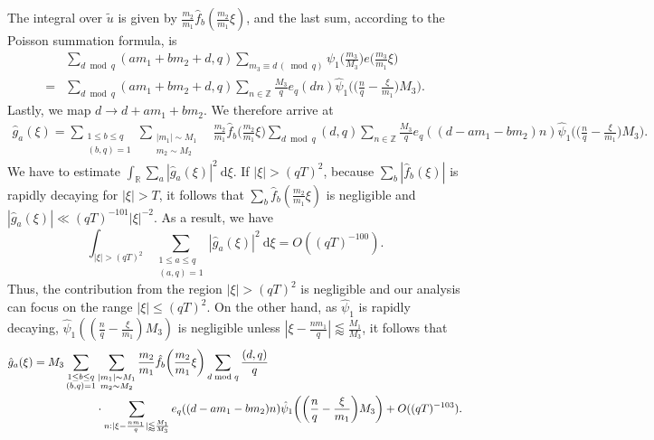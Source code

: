 \documentclass[12pt]{amsart}
\theoremstyle{definition}
\theoremstyle{plain}
\theoremstyle{remark}
\numberwithin{equation}{section}
\numberwithin{theorem}{section}
\numberwithin{equation}{section}
\begin{document}
	The integral over $\tilde{u}$ is given by $\frac{m_{2}}{m_{1}}\hat{f}_{b}(\frac{m_{2}}{m_{1}}\xi)$,  and the last sum, according to the Poisson summation formula, is
	\begin{align*}
		&\sum_{d \bmod q}(am_{1}+bm_{2}+d, q)\sum_{m_{3} \equiv d \, (\!\bmod q)}\psi_{1}\bigg(\frac{m_{3}}{M_{3}}\bigg)e\bigg(\frac{m_{3}}{m_{1}}\xi\bigg)
		\\
		=&\sum_{d \bmod q}(am_{1}+bm_{2}+d, q)\sum_{n \in \mathbb{Z}}\frac{M_{3}}{q}e_q(dn)\hat{\psi}_{1}\bigg(\bigg(\frac{n}{q}-\frac{\xi}{m_{1}}\bigg)M_{3}\bigg).
	\end{align*}
	Lastly, we map $d \to d+am_1+bm_2$. We therefore arrive at
	\begin{align*}
		\hat{g}_{a}(\xi)=\sum_{\substack{1 \leq b \leq q \\ (b, q)=1}}\sum_{\substack{|m_{1}|\sim M_{1} \\ m_{2}\sim M_{2}}}&\frac{m_{2}}{m_{1}}\hat{f}_{b}\bigg(\frac{m_{2}}{m_{1}}\xi\bigg) \sum_{d \bmod q}(d, q)\sum_{n \in \mathbb{Z}}\frac{M_{3}}{q} e_q((d-am_1-bm_2)n)\hat{\psi}_{1}\bigg(\bigg(\frac{n}{q}-\frac{\xi}{m_{1}}\bigg)M_{3}\bigg).
	\end{align*}
	We have to estimate $\int_{\mathbb{R}}\sum_{a}|\hat{g}_{a}(\xi)|^{2}\: \mathrm{d} \xi$. If $|\xi|>(qT)^{2}$, because $\sum_{b}|\hat{f}_{b}(\xi)|$ is rapidly decaying for $|\xi|> T$, it follows that $\sum_{b}\hat{f}_{b}(\frac{m_{2}}{m_{1}}\xi)$ is negligible and $|\hat{g}_{a}(\xi)|\ll (qT)^{-101}|\xi|^{-2}$. As a result, we have
	\[\int_{|\xi|> (qT)^{2}}\sum_{\substack{1 \leq a \leq q \\ (a, q)=1}}|\hat{g}_{a}(\xi)|^{2}\: \mathrm{d} \xi=O((qT)^{-100}).\] 
	Thus, the contribution from the region $|\xi| > (qT)^2$ is negligible and our analysis can focus on the range $|\xi|\leq (qT)^{2}$. On the other hand, as $\hat{\psi}_{1}$ is rapidly decaying, $\hat{\psi}_{1}((\frac{n}{q}-\frac{\xi}{m_{1}})M_{3})$ is negligible unless $|\xi - \frac{nm_{1}}{q}|\lessapprox \frac{M_{1}}{M_{3}}$, it follows that
	\begin{align}\label{hgab}
		\hat{g}_{a}(\xi)= M_{3}\sum_{\substack{1 \leq b \leq q \\ (b, q)=1}}&\sum_{\substack{|m_{1}|\sim M_{1} \\ m_{2}\sim M_{2}}}\frac{m_{2}}{m_{1}}\hat{f}_{b}\bigg(\frac{m_{2}}{m_{1}}\xi\bigg)\sum_{d \bmod q}\frac{(d, q)}{q}
		\notag
		\\
		&\cdot \sum_{n: |\xi - \frac{nm_{1}}{q}|\lessapprox \frac{M_{1}}{M_{3}}}e_q((d-am_1-bm_2)n)\hat{\psi}_{1}\bigg(\bigg(\frac{n}{q}-\frac{\xi}{m_{1}}\bigg)M_{3}\bigg)+O((qT)^{-103}).
	\end{align}
\end{document}
